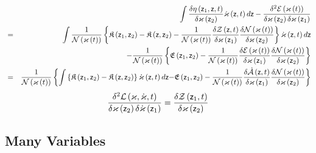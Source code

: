 \begin{eqnarray}
&&\int \frac{\delta \eta \left( {\sf z}_{1},{\sf z},t\right) }{\delta
\varkappa \left( {\sf z}_{2}\right) }{\cal \dot{\varkappa}}\left( {\sf z}%
,t\right) d{\sf z}-\frac{\delta ^{2}{\cal E}\left( {\cal \varkappa }\left(
t\right) \right) }{\delta \varkappa \left( {\sf z}_{2}\right) \delta
\varkappa \left( {\sf z}_{1}\right) } \\
&=&\int \frac{1}{{\cal N}\left( {\cal \varkappa }\left( t\right) \right) }%
\left\{ {\frak K}\left( {\sf z}_{1},{\sf z}_{2}\right) -{\frak K}\left( {\sf %
z},{\sf z}_{2}\right) -\frac{1}{{\cal N}\left( {\cal \varkappa }\left(
t\right) \right) }\frac{\delta {\cal Z}\left( {\sf z},t\right) }{\delta
\varkappa \left( {\sf z}_{1}\right) }\frac{\delta {\cal N}\left( {\cal %
\varkappa }\left( t\right) \right) }{\delta \varkappa \left( {\sf z}%
_{2}\right) }\right\} {\cal \dot{\varkappa}}\left( {\sf z},t\right) d{\sf z}
\\
&&-\frac{1}{{\cal N}\left( {\cal \varkappa }\left( t\right) \right) }\left\{ 
{\frak E}\left( {\sf z}_{1},{\sf z}_{2}\right) -\frac{1}{{\cal N}\left( 
{\cal \varkappa }\left( t\right) \right) }\frac{\delta {\cal E}\left(
\varkappa \left( t\right) \right) }{\delta \varkappa \left( {\sf z}%
_{1}\right) }\frac{\delta {\cal N}\left( \varkappa \left( t\right) \right) }{%
\delta \varkappa \left( {\sf z}_{2}\right) }\right\}  \\
&=&\frac{1}{{\cal N}\left( {\cal \varkappa }\left( t\right) \right) }\left\{
\int \left\{ {\frak K}\left( {\sf z}_{1},{\sf z}_{2}\right) -{\frak K}\left( 
{\sf z},{\sf z}_{2}\right) \right\} {\cal \dot{\varkappa}}\left( {\sf z}%
,t\right) d{\sf z-}{\frak E}\left( {\sf z}_{1},{\sf z}_{2}\right) -\frac{1}{%
{\cal N}\left( {\cal \varkappa }\left( t\right) \right) }\frac{\delta {\cal 
\dot{A}}\left( {\sf z},t\right) }{\delta \varkappa \left( {\sf z}_{1}\right) 
}\frac{\delta {\cal N}\left( {\cal \varkappa }\left( t\right) \right) }{%
\delta \varkappa \left( {\sf z}_{2}\right) }\right\} 
\end{eqnarray}%
\begin{equation}
\frac{\delta ^{2}{\cal L}\left( \varkappa ,\dot{\varkappa},t\right) }{\delta
\varkappa \left( {\sf z}_{2}\right) \delta \dot{\varkappa}\left( {\sf z}%
_{1}\right) }=\frac{\delta {\cal Z}\left( {\sf z}_{1},t\right) }{\delta
\varkappa \left( {\sf z}_{2}\right) }
\end{equation}

\subsection{Many Variables}

